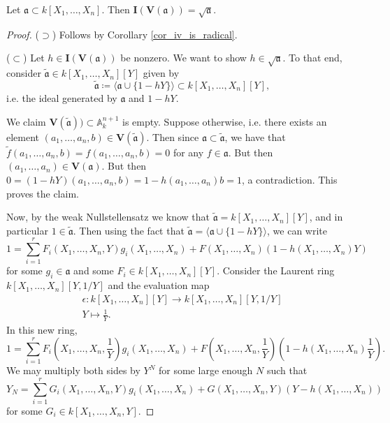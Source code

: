 \documentclass[12pt]{article}
\begin{document}
\begin{theorem}
	Let $\mathfrak{a}\subset k[X_1,\dots,X_n]$. Then $\mathbf{I}(\mathbf{V}(\mathfrak{a}))=\sqrt{\mathfrak{a}}$.
\end{theorem}
\begin{proof}
	($\supset$) Follows by Corollary \ref{cor_iv_is_radical}. 

	($\subset$) Let $h\in\mathbf{I}(\mathbf{V}(\mathfrak{a}))$ be nonzero. We want to show $h\in\sqrt{\mathfrak{a}}$. To that end, consider $\tilde{\mathfrak{a}}\in k[X_1,\dots,X_n][Y]$ given by 
	\begin{equation*}
		\tilde{\mathfrak{a}} \coloneqq \langle \mathfrak{a}\cup\{1-hY\}\rangle\subset k[X_1,\dots,X_n][Y],
	\end{equation*}
	i.e. the ideal generated by $\mathfrak{a}$ and $1-hY$. 

	We claim $\mathbf{V}(\tilde{\mathfrak{a}}))\subset\mathbb{A}^{n+1}_k$ is empty. Suppose otherwise, i.e. there exists an element $(a_1,\dots,a_n,b)\in\mathbf{V}(\tilde{\mathfrak{a}})$. Then since $\mathfrak{a}\subset\tilde{\mathfrak{a}}$, we have that $\tilde{f}(a_1,\dots,a_n,b)=f(a_1,\dots,a_n,b)=0$ for any $f\in\mathfrak{a}$. But then $(a_1,\dots,a_n)\in\mathbf{V}(\mathfrak{a})$. But then $0 = (1-hY)(a_1,\dots,a_n,b) = 1 - h(a_1,\dots,a_n)b=1$, a contradiction. This proves the claim.

	Now, by the weak Nullstellensatz we know that $\tilde{\mathfrak{a}} = k[X_1,\dots,X_n][Y]$, and in particular $1\in\tilde{\mathfrak{a}}$. Then using the fact that $\tilde{\mathfrak{a}}=\langle\mathfrak{a}\cup\{1-hY\}\rangle$, we can write 
	\begin{equation*}
		1 = \sum_{i=1}^r F_i(X_1,\dots,X_n,Y)g_i(X_1,\dots,X_n) + F(X_1,\dots,X_n)(1-h(X_1,\dots,X_n)Y)
	\end{equation*}
	for some $g_i\in\mathfrak{a}$ and some $F_i\in k[X_1,\dots,X_n][Y]$. Consider the Laurent ring $k[X_1,\dots,X_n][Y,1/Y]$ and the evaluation map 
	\begin{gather*}
		\epsilon: k[X_1,\dots,X_n][Y] \to k[X_1,\dots,X_n][Y,1/Y] \\
		Y \mapsto \frac{1}{Y}.
	\end{gather*}
	In this new ring, 
	\begin{equation*}
		1 = \sum_{i=1}^r F_i(X_1,\dots,X_n,\frac{1}{Y})g_i(X_1,\dots,X_n) + F(X_1,\dots,X_n,\frac{1}{Y})(1-h(X_1,\dots,X_n)\frac{1}{Y}).
	\end{equation*}
	We may multiply both sides by $Y^N$ for some large enough $N$ such that 
	\begin{equation*}
		Y_N = \sum_{i=1}^r G_i(X_1,\dots,X_n,Y)g_i(X_1,\dots,X_n) + G(X_1,\dots,X_n,Y)(Y-h(X_1,\dots,X_n))
	\end{equation*}
	for some $G_i \in k[X_1,\dots,X_n,Y]$.


\end{proof}
\end{document}
